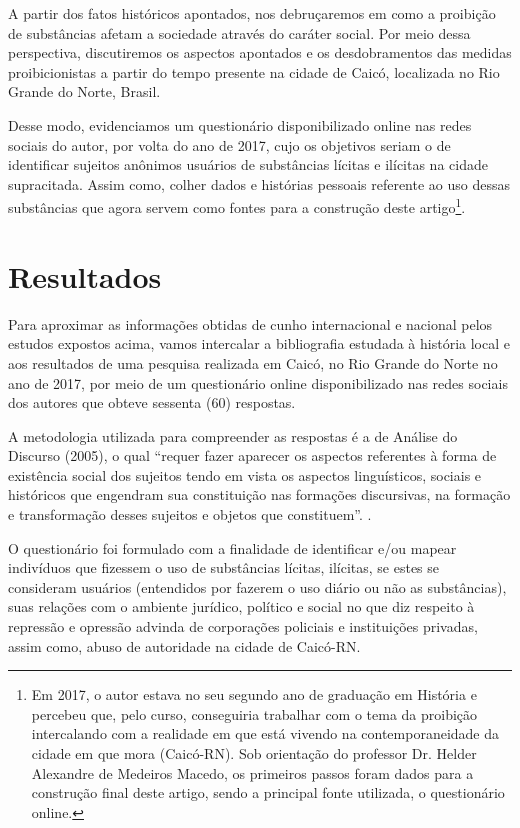 \begin{refsection}
    A partir dos fatos históricos apontados, nos debruçaremos em como a proibição de substâncias afetam a sociedade através do caráter social. Por meio dessa perspectiva, discutiremos os aspectos apontados e os desdobramentos das medidas proibicionistas a partir do tempo presente na cidade de Caicó, localizada no Rio Grande do Norte, Brasil.  

    Desse modo, evidenciamos um questionário disponibilizado online nas redes sociais do autor, por volta do ano de 2017, cujo os objetivos seriam o de identificar sujeitos anônimos usuários de substâncias lícitas e ilícitas na cidade supracitada. Assim como, colher dados e histórias pessoais referente ao uso dessas substâncias que agora servem como fontes para a construção deste artigo\footnote{Em 2017, o autor estava no seu segundo ano de graduação em História e percebeu que, pelo curso, conseguiria trabalhar com o tema da proibição intercalando com a realidade em que está vivendo na contemporaneidade da cidade em que mora (Caicó-RN). Sob orientação do professor Dr. Helder Alexandre de Medeiros Macedo, os primeiros passos foram dados para a construção final deste artigo, sendo a principal fonte utilizada, o questionário online.}.

    \section{Resultados}

    Para aproximar as informações obtidas de cunho internacional e nacional pelos estudos expostos acima, vamos intercalar a bibliografia estudada à história local e aos resultados de uma pesquisa realizada em Caicó, no Rio Grande do Norte no ano de 2017, por meio de um questionário online disponibilizado nas redes sociais dos autores que obteve sessenta (60) respostas. 

    A metodologia utilizada para compreender as respostas é a de Análise do Discurso (2005), o qual ``requer fazer aparecer os aspectos referentes à forma de existência social dos sujeitos tendo em vista os aspectos linguísticos, sociais e históricos que engendram sua constituição nas formações discursivas, na formação e transformação desses sujeitos e objetos que constituem''. \cite[p.~30]{Fernandes2012Discurso}.

    O questionário foi formulado com a finalidade de identificar e/ou mapear indivíduos que fizessem o uso de substâncias lícitas, ilícitas, se estes se consideram usuários (entendidos por fazerem o uso diário ou não as substâncias), suas relações com o ambiente jurídico, político e social no que diz respeito à repressão e opressão advinda de corporações policiais e instituições privadas, assim como, abuso de autoridade na cidade de Caicó-RN.   


\end{refsection}
